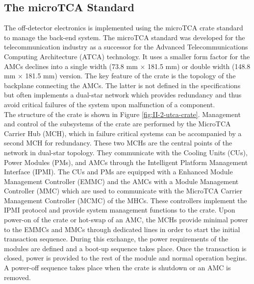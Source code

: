     \subsection{The microTCA Standard}

      The off-detector electronics is implemented using the microTCA crate standard to manage the back-end system. The microTCA standard was developed for the telecommunication industry as a successor for the Advanced Telecommunications Computing Architecture (ATCA) technology. It uses a smaller form factor for the AMCs declines into a single width (73.8 mm $ \times $ 181.5 mm) or double width (148.8 mm $ \times $ 181.5 mm) version. The key feature of the crate is the topology of the backplane connecting the AMCs. The latter is not defined in the specifications but often implements a dual-star network which provides redundancy and thus avoid critical failures of the system upon malfunction of a component. \\

      The structure of the crate is shown in Figure \ref{fig:II-2-utca-crate}. Management and control of the subsystems of the crate are performed by the MicroTCA Carrier Hub (MCH), which in failure critical systems can be accompanied by a second MCH for redundancy. These two MCHs are the central points of the network in dual-star topology. They communicate with the Cooling Units (CUs), Power Modules (PMs), and AMCs through the Intelligent Platform Management Interface (IPMI). The CUs and PMs are equipped with a Enhanced Module Management Controller (EMMC) and the AMCs with a Module Management Controller (MMC) which are used to communicate with the MicroTCA Carrier Management Controller (MCMC) of the MHCs. These controllers implement the IPMI protocol and provide system management functions to the crate. Upon power-on of the crate or hot-swap of an AMC, the MCHs provide minimal power to the EMMCs and MMCs through dedicated lines in order to start the initial transaction sequence. During this exchange, the power requirements of the modules are defined and a boot-up sequence takes place. Once the transaction is closed, power is provided to the rest of the module and normal operation begins. A power-off sequence takes place when the crate is shutdown or an AMC is removed. \\

